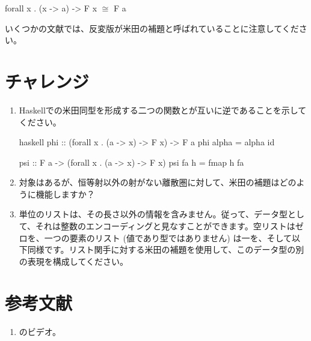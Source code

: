 \begin{snipv}
forall x . (x -> a) -> F x \ensuremath{\cong} F a
\end{snipv}
いくつかの文献では、反変版が米田の補題と呼ばれていることに注意してください。

\section{チャレンジ}

\begin{enumerate}
  \tightlist
  \item
        Haskellでの米田同型を形成する二つの関数とが互いに逆であることを示してください。

        \begin{snip}{haskell}
phi :: (forall x . (a -> x) -> F x) -> F a
phi alpha = alpha id

psi :: F a -> (forall x . (a -> x) -> F x)
psi fa h = fmap h fa
\end{snip}
  \item
        対象はあるが、恒等射以外の射がない離散圏に対して、米田の補題はどのように機能しますか？
  \item
        単位のリスト\code{{[}(){]}}は、その長さ以外の情報を含みません。従って、データ型として、それは整数のエンコーディングと見なすことができます。空リストはゼロを、一つの要素のリスト\code{{[}(){]}} (値であり型ではありません) は一を、そして以下同様です。リスト関手に対する米田の補題を使用して、このデータ型の別の表現を構成してください。
\end{enumerate}

\section{参考文献}

\begin{enumerate}
  \tightlist
  \item
        のビデオ。
\end{enumerate}

